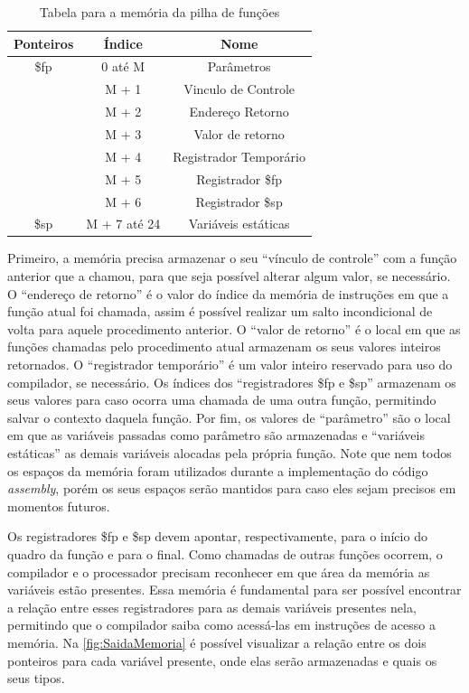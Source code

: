 \documentclass[
	12pt,				%
	oneside,
	a4paper,			%
	english,			%
	french,				%
	spanish,			%
	brazil,				%
	]{abntex2}
\begin{document}
\begin{table}[htb]
\centering
\ABNTEXfontereduzida
\caption{Tabela para a memória da pilha de funções} 
\label{tab:Memoria}
\begin{tabular}{||c||c||c||}
\hline
Ponteiros & Índice       & Nome                   \\ [0.5ex] \hline \hline 
\$fp      & 0 até M      & Parâmetros             \\ \hline
          & M + 1        & Vinculo de Controle    \\ \hline
          & M + 2        & Endereço Retorno       \\ \hline
          & M + 3        & Valor de retorno       \\ \hline
          & M + 4        & Registrador Temporário \\ \hline
          & M + 5        & Registrador \$fp       \\ \hline
          & M + 6        & Registrador \$sp       \\ \hline
\$sp      & M + 7 até 24 & Variáveis estáticas    \\ \hline
\end{tabular}
\end{table}

Primeiro, a memória precisa armazenar o seu ``vínculo de controle'' com a função anterior que a chamou, para que seja possível alterar algum valor, se necessário. O ``endereço de retorno'' é o valor do índice da memória de instruções em que a função atual foi chamada, assim é possível realizar um salto incondicional de volta para aquele procedimento anterior. O ``valor de retorno'' é o local em que as funções chamadas pelo procedimento atual armazenam os seus valores inteiros retornados. O ``registrador temporário'' é um valor inteiro reservado para uso do compilador, se necessário. Os índices dos ``registradores \$fp e \$sp'' armazenam os seus valores para caso ocorra uma chamada de uma outra função, permitindo salvar o contexto daquela função. Por fim, os valores de ``parâmetro'' são o local em que as variáveis passadas como parâmetro são armazenadas e ``variáveis estáticas'' as demais variáveis alocadas pela própria função. Note que nem todos os espaços da memória foram utilizados durante a implementação do código \emph{assembly}, porém os seus espaços serão mantidos para caso eles sejam precisos em momentos futuros.

Os registradores \$fp e \$sp devem apontar, respectivamente, para o início do quadro da função e para o final. Como chamadas de outras funções ocorrem, o compilador e o processador precisam reconhecer em que área da memória as variáveis estão presentes. Essa memória é fundamental para ser possível encontrar a relação entre esses registradores para as demais variáveis presentes nela, permitindo que o compilador saiba como acessá-las em instruções de acesso a memória. Na \autoref{fig:SaidaMemoria} é possível visualizar a relação entre os dois ponteiros para cada variável presente, onde elas serão armazenadas e quais os seus tipos.
\end{document}
